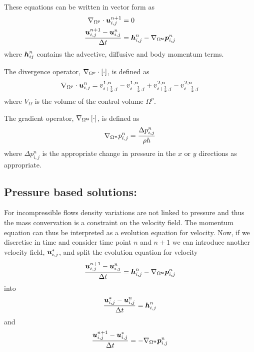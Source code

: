 These equations can be written in vector form as
\begin{equation}
  \begin{split}
    \divergence{\Omega^{p}}{\vectr{u}^{n+1}_{i,j}}&=0\\
    \dfrac{\vectr{u}^{n+1}_{i,j}-\vectr{u}^{n}_{i,j}}{\Delta
      t}&=\vectr{h}^{n}_{i,j}-\gradient{\Omega^{\vectr{u}}}{\vectr{p}^{n}_{i,j}}
  \end{split}
\end{equation}
where $\boldsymbol{h}^{n}_{ij}$ contains the advective, diffusive and body momentum
terms.

The divergence operator, $\divergence{\Omega^{p}}{\sqbrac{\cdot}}$, is defined as
\begin{equation}
  \divergence{\Omega^{p}}{\vectr{u}^{n}_{i,j}}=v^{1,n}_{i+\frac{1}{2},j}-v^{1,n}_{i-\frac{1}{2},j}+v^{2,n}_{i+\frac{1}{2},j}-v^{2,n}_{i-\frac{1}{2},j}
\end{equation}
where $V_{\Omega}$ is the volume of the control volume $\Omega^{p}$.

The gradient operator, $\gradient{\Omega^{\vectr{u}}}{\sqbrac{\cdot}}$, is
defined as
\begin{equation}
  \gradient{\Omega^{\vectr{u}}}{p^{n}_{i,j}}=\dfrac{\Delta p^{n}_{i,j}}{\rho h}
\end{equation}
where $\Delta p^{n}_{i,j}$ is the appropriate change in pressure in the $x$ or
$y$ directions as appropriate.

\subsection{Pressure based solutions:}

For incompressible flows density variations are not linked to pressure and
thus the mass convervation is a constraint on the velocity field. The momentum
equation can thus be interpreted as a evolution equation for velocity. Now, if we
discretise in time and consider time point $n$ and $n+1$ we can introduce
another velocity field, $\boldsymbol{u}^{*}_{i,j}$, and split the evolution
equation for velocity
\begin{equation}
  \dfrac{\vectr{u}^{n+1}_{i,j}-\vectr{u}^{n}_{i,j}}{\Delta
    t}=\vectr{h}^{n}_{i,j}-\gradient{\Omega^{\vectr{u}}}{\vectr{p}^{n}_{i,j}}
\end{equation}
into
\begin{equation}
  \dfrac{\boldsymbol{u}^{*}_{i,j}-\boldsymbol{u}^{n}_{i,j}}{\Delta t}=\boldsymbol{h}^{n}_{i,j}
\end{equation}
and
\begin{equation}
  \dfrac{\vectr{u}^{n+1}_{i,j}-\vectr{u}^{*}_{i,j}}{\Delta t}=-\gradient{\Omega^{\vectr{u}}}{\vectr{p}^{n}_{i,j}}
\end{equation}

